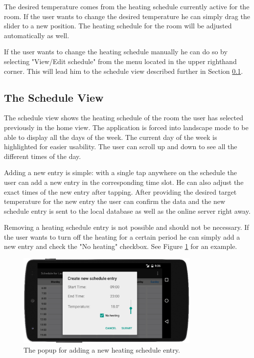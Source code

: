 The desired temperature comes from the heating schedule currently active for the room. If the user wants to change the desired temperature he can simply drag the slider to a new position. The heating schedule for the room will be adjusted automatically as well.

If the user wants to change the heating schedule manually he can do so by selecting "View/Edit schedule" from the menu located in the upper righthand corner. This will lead him to the schedule view described further in Section \ref{sec:schedule_view}. 

\subsection{The Schedule View}
\label{sec:schedule_view}
\label{sec:last_view}
The schedule view shows the heating schedule of the room the user has selected previously in the home view. The application is forced into landscape mode to be able to display all the days of the week. The current day of the week is highlighted for easier usability. The user can scroll up and down to see all the different times of the day. 

Adding a new entry is simple: with a single tap anywhere on the schedule the user can add a new entry in the corresponding time slot. He can also adjust the exact times of the new entry after tapping. After providing the desired target temperature for the new entry the user can confirm the data and the new schedule entry is sent to the local database as well as the online server right away. 

Removing a heating schedule entry is not possible and should not be necessary. If the user wants to turn off the heating for a certain period he can simply add a new entry and check the "No heating" checkbox. See Figure \ref{fig:new_schedule_entry} for an example.

\begin{figure}
	\begin{center}
		\includegraphics[width=0.8\textwidth]{images/new_schedule_entry.png}
	\end{center}
	\caption{The popup for adding a new heating schedule entry.}
	\label{fig:new_schedule_entry}
\end{figure}

